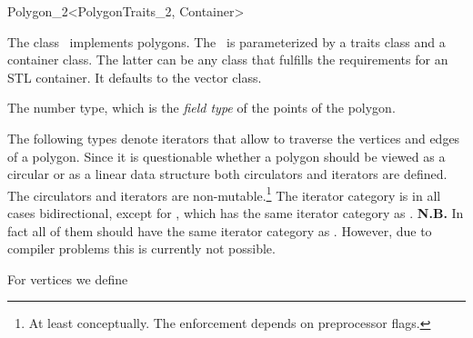 

\begin{ccRefClass}{Polygon_2<PolygonTraits_2, Container>}


\ccDefinition
  
The class \ccRefName\ implements polygons.
The \ccRefName\ is parameterized by a traits class and a container class.
The latter can be any class that fulfills the requirements for an STL container.
It defaults to the vector class.




\ccTypes
{}
\ccGlue
{}

{The number type, which is the {\em field type} of the points of the polygon.} 
\ccGlue
{}
\ccGlue
{}

The following types denote iterators that allow to traverse the vertices and
edges of a polygon. 
Since it is questionable whether a polygon should be viewed as a circular or 
as a linear data structure both circulators and iterators are defined.
The circulators and iterators are non-mutable.\footnote{At least conceptually.
The enforcement depends on preprocessor flags.}
The iterator category is in all cases bidirectional, except for
, which has the
same iterator category as .
{\bf N.B.} In fact all of them should have the same iterator category as
. However, due to compiler problems this is currently
not possible.

For vertices we define


\end{ccRefClass}
